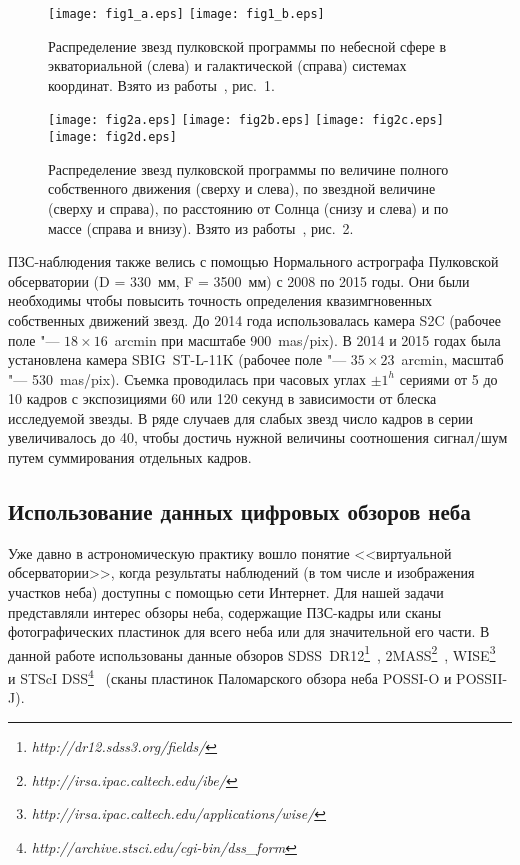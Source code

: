 \begin{figure}[h]
\centering
\texttt{[image: fig1\_a.eps]}
\texttt{[image: fig1\_b.eps]}
\caption{Распределение звезд пулковской программы по небесной сфере в экваториальной (слева) и галактической (справа) системах координат. Взято из работы~\cite{2015AstL...41..833K}, рис.~1.}
 \label{fig:15alloc}
\end{figure}

\begin{figure}[h]
\centering
\texttt{[image: fig2a.eps]}
\texttt{[image: fig2b.eps]}
\texttt{[image: fig2c.eps]}
\texttt{[image: fig2d.eps]}
\caption{Распределение звезд пулковской программы по величине полного собственного движения (сверху и слева), по звездной величине (сверху и справа), по расстоянию от Солнца (снизу и слева) и по массе (справа и внизу). Взято из работы~\cite{2015AstL...41..833K}, рис.~2.}
\label{fig:15hist}
\end{figure}

ПЗС-наблюдения также велись с помощью Нормального астрографа Пулковской обсерватории (D = 330~мм, F = 3500~мм) с 2008 по 2015 годы. Они были необходимы чтобы повысить точность определения квазимгновенных собственных движений звезд.  До 2014 года использовалась камера S2C (рабочее поле "--- $18\times16$~arcmin при масштабе 900~mas/pix). В 2014 и 2015 годах была установлена камера \mbox{SBIG ST-L-11K} (рабочее поле "--- $35\times23$~arcmin, масштаб "--- 530~mas/pix). Съемка проводилась при часовых углах $\pm1^h$ сериями от 5 до 10 кадров с экспозициями 60 или 120 секунд в зависимости от блеска исследуемой звезды. В ряде случаев для слабых звезд число кадров в серии увеличивалось до 40, чтобы достичь нужной величины соотношения сигнал/шум путем суммирования отдельных кадров.
\subsection{Использование данных цифровых обзоров неба} \label{subsec:ch3/sect2/sub2}
Уже давно в астрономическую практику вошло понятие <<виртуальной обсерватории>>, когда результаты наблюдений (в том числе и изображения участков неба) доступны с помощью сети Интернет.  Для нашей задачи представляли интерес обзоры неба, содержащие ПЗС-кадры или сканы фотографических пластинок для всего неба или для значительной его части. В данной работе использованы данные обзоров SDSS~DR12\footnote{\textit{http://dr12.sdss3.org/fields/}}~\cite{2015ApJS..219...12A}, 2MASS\footnote{\textit{http://irsa.ipac.caltech.edu/ibe/}}~\cite{2003tmc..book.....C}, WISE\footnote{\textit{http://irsa.ipac.caltech.edu/applications/wise/}}~\cite{2010AJ....140.1868W} и STScI DSS\footnote{\textit{http://archive.stsci.edu/cgi-bin/dss\_form}}~\cite{1998asal.confE...3L} (сканы пластинок Паломарского обзора неба POSSI-O и POSSII-J).

